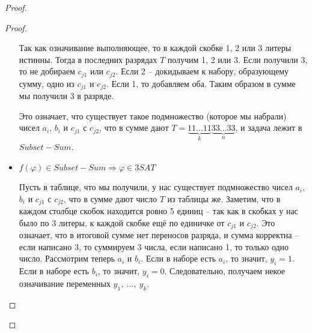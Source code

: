 \documentclass[a4paper,12pt]{article}
\begin{document}
\begin{proof}
\begin{proof}
\begin{itemize}
            Так как означивание выполняющее, то в каждой скобке 1, 2 или 3 литеры истинны. Тогда в последних разрядах $T$ получим 1, 2 или 3. Если получили 3, то не добираем $c_{j1}$ или $c_{j2}$. Если 2 -- докидываем к набору, образующему сумму, одно из $c_{j1}$ и $c_{j2}$. Если 1, то добавляем оба. Таким образом в сумме мы получили 3 в разряде.
            
            Это означает, что существует такое подмножество (которое мы набрали) чисел $a_i$, $b_i$ и $c_{j1}$ с $c_{j2}$, что в сумме дают $T = \underbrace{11\ldots11}_{k}\underbrace{33\ldots33}_{n}$, и задача лежит в  $Subset-Sum$.
            \item $f(\varphi) \in Subset-Sum \Longrightarrow \varphi \in 3SAT$
            
            Пусть в таблице, что мы получили, у нас существует подмножество чисел $a_i$, $b_i$ и $c_{j1}$ с $c_{j2}$, что в сумме дают число $T$ из таблицы же. Заметим, что в каждом столбце скобок находится ровно 5 единиц -- так как в скобках у нас было по 3 литеры, к каждой скобке ещё по единичке от $c_{j1}$ и $c_{j2}$. Это означает, что в итоговой сумме нет переносов разряда, и сумма корректна -- если написано 3, то суммируем 3 числа, если написано 1, то только одно число. Рассмотрим теперь $a_i$ и $b_i$. Если в наборе есть $a_i$, то значит, $y_i = 1$. Если в наборе есть $b_i$, то значит, $y_i = 0$. Следовательно, получаем некое означивание переменных $y_1,\ \ldots,\ y_k$.
            

\end{itemize}
\end{proof}
\end{proof}
\end{document}
